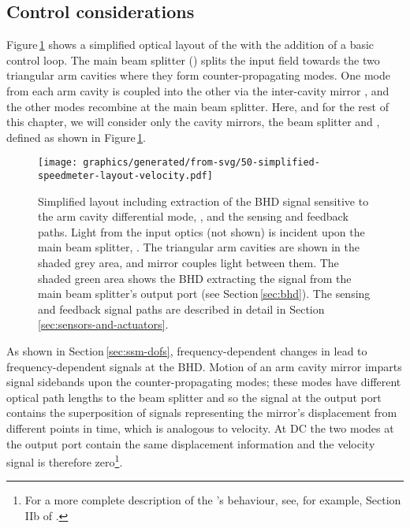 \subsection{\label{sec:simple-control}Control considerations}
Figure\,\ref{fig:simplified-speedmeter-layout-velocity} shows a simplified optical layout of the \SSMEXPT{} with the addition of a basic control loop. The main beam splitter (\MSIX{}) splits the input field towards the two triangular arm cavities where they form counter-propagating modes. One mode from each arm cavity is coupled into the other via the inter-cavity mirror \MNINE{}, and the other modes recombine at the main beam splitter. Here, and for the rest of this chapter, we will consider only the cavity mirrors, the beam splitter and \MNINE{}, defined as shown in Figure\,\ref{fig:simplified-speedmeter-layout-velocity}.

\begin{figure}
  \centering
  \texttt{[image: graphics/generated/from-svg/50-simplified-speedmeter-layout-velocity.pdf]}
  \caption[Simplified layout of the \SSMEXPT{} including a basic velocity feedback loop]{\label{fig:simplified-speedmeter-layout-velocity}Simplified \SSM{} layout including extraction of the BHD signal sensitive to the arm cavity differential mode, \LMINUS{}, and the sensing and feedback paths. Light from the input optics (not shown) is incident upon the main beam splitter, \MSIX{}. The triangular arm cavities are shown in the shaded grey area, and mirror \MNINE{} couples light between them. The shaded green area shows the BHD extracting the signal from the main beam splitter's output port (see Section\,\ref{sec:bhd}). The sensing and feedback signal paths are described in detail in Section\,\ref{sec:sensors-and-actuators}.}
\end{figure}

As shown in Section\,\ref{sec:ssm-dofs}, frequency-dependent changes in \LMINUS{} lead to frequency-dependent signals at the \gls{BHD}. Motion of an arm cavity mirror imparts signal sidebands upon the counter-propagating modes; these modes have different optical path lengths to the beam splitter and so the signal at the output port contains the superposition of signals representing the mirror's displacement from different points in time, which is analogous to velocity. At \gls{DC} the two modes at the output port contain the same displacement information and the velocity signal is therefore zero\footnote{For a more complete description of the \SSM{}'s behaviour, see, for example, Section\,IIb of \cite{Chen2003}.}.

